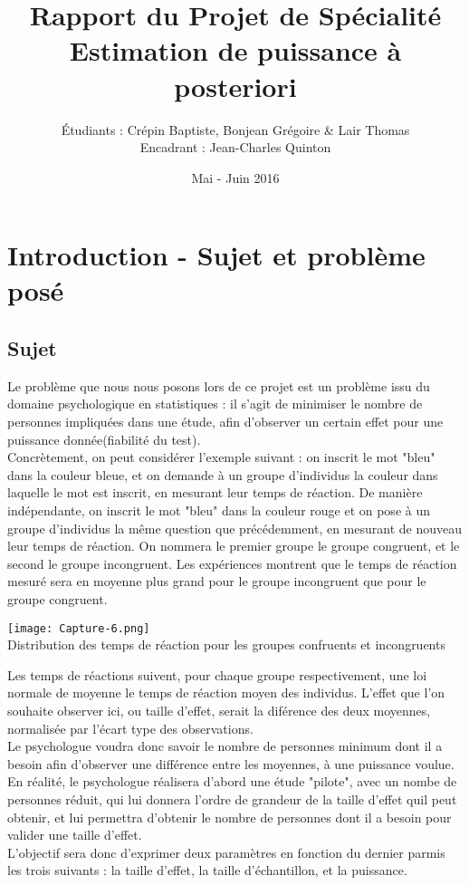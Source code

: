 \documentclass[a4paper,11pt]{article}
\title{Rapport du Projet de Spécialité\\ Estimation de puissance à posteriori}
\author{Étudiants : Crépin Baptiste, Bonjean Grégoire \& Lair Thomas\\ Encadrant : Jean-Charles Quinton}
\date{Mai - Juin 2016}
\begin{document}
\maketitle

\section{Introduction - Sujet et problème posé}
\subsection{Sujet}
Le problème que nous nous posons lors de ce projet est un problème issu du domaine psychologique en statistiques : il s'agit de minimiser le nombre de personnes impliquées dans une étude, afin d'observer un certain effet pour une puissance donnée(fiabilité du test).
\\Concrètement, on peut considérer l'exemple suivant : on inscrit le mot "bleu" dans la couleur bleue, et on demande à un groupe d'individus la couleur dans laquelle le mot est inscrit, en mesurant leur temps de réaction. De manière indépendante, on inscrit le mot "bleu" dans la couleur rouge et on pose à un groupe d'individus la même question que précédemment, en mesurant de nouveau leur temps de réaction. On nommera le premier groupe le groupe congruent, et le second le groupe incongruent. Les expériences montrent que le temps de réaction mesuré sera en moyenne plus grand pour le groupe incongruent que pour le groupe congruent.
\\[1 cm]
\begin{center}
\texttt{[image: Capture-6.png]}\\
Distribution des temps de réaction pour les groupes confruents et incongruents
\\[1 cm]
\end{center}

Les temps de réactions suivent, pour chaque groupe respectivement, une loi normale de moyenne le temps de réaction moyen des individus. L'effet que l'on souhaite observer ici, ou taille d'effet, serait la diférence des deux moyennes, normalisée par l'écart type des observations.
\\Le psychologue voudra donc savoir le nombre de personnes minimum dont il a besoin afin d'observer une différence entre les moyennes, à une puissance voulue.
\\En réalité, le psychologue réalisera d'abord une étude "pilote", avec un nombe de personnes réduit, qui lui donnera l'ordre de grandeur de la taille d'effet quil peut obtenir, et lui permettra d'obtenir le nombre de personnes dont il a besoin pour valider une taille d'effet.
\\L'objectif sera donc d'exprimer deux paramètres en fonction du dernier parmis les trois suivants : la taille d'effet, la taille d'échantillon, et la puissance.
\end{document}
